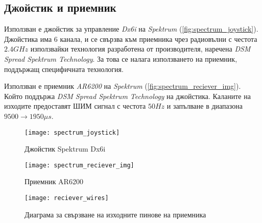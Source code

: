 \subsection{Джойстик и приемник}

Използван е джойстик за управление \textit{Dx6i} на \textit{Spektrum} (\autoref{fig:spectrum_joystick}).
Джойстика има 6 канала,
и се свързва към  приемника чрез радиовълни с честота \(2.4GHz\) използвайки
технология разработена от производителя, наречена \textit{DSM Spread Spektrum Technology}.
За това се налага използването на приемник, поддържащ специфичната технология.

Използван е приемник \textit{AR6200} на \textit{Spektrum} (\autoref{fig:spectrum_reciever_img}).
Който поддържа \textit{DSM Spread Spektrum Technology} на джойстика.
Каланите на изходите предоставят ШИМ сигнал с честота \(50Hz\) и запълване в диапазона \(9500\to1950 \mu s\).


\begin{figure}[htpb!]
    \centering
    \texttt{[image: spectrum\_joystick]}
    \caption{Джойстик Spektrum Dx6i}
    \label{fig:spectrum_joystick}
\end{figure}

\begin{figure}[htpb!]
    \centering
    \texttt{[image: spectrum\_reciever\_img]}
    \caption{Приемник AR6200}
    \label{fig:spectrum_reciever_img}
\end{figure}

\begin{figure}[htpb!]
    \centering
    \texttt{[image: reciever\_wires]}
    \caption{Диаграма за свързване на изходните пинове на приемника}
    \label{fig:reciever_wires}
\end{figure}



\FloatBarrier
